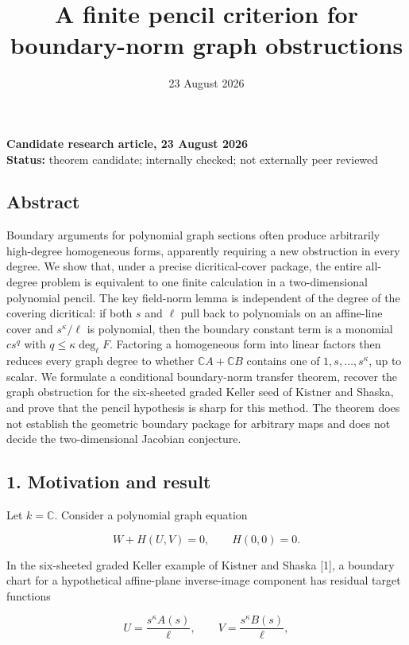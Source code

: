 \documentclass[
  11pt,
  a4paper,
]{article}
\title{A finite pencil criterion for boundary-norm graph obstructions}
\author{}
\date{23 August 2026}
\begin{document}
\maketitle

\textbf{Candidate research article, 23 August 2026}\\
\textbf{Status:} theorem candidate; internally checked; not externally
peer reviewed

\subsection{Abstract}\label{abstract}

Boundary arguments for polynomial graph sections often produce
arbitrarily high-degree homogeneous forms, apparently requiring a new
obstruction in every degree. We show that, under a precise
dicritical-cover package, the entire all-degree problem is equivalent to
one finite calculation in a two-dimensional polynomial pencil. The key
field-norm lemma is independent of the degree of the covering
dicritical: if both \(s\) and \(\ell\) pull back to polynomials on an
affine-line cover and \(s^\kappa/\ell\) is polynomial, then the boundary
constant term is a monomial \(cs^q\) with \(q\le\kappa\deg_\ell F\).
Factoring a homogeneous form into linear factors then reduces every
graph degree to whether \(\mathbb C A+\mathbb C B\) contains one of
\(1,s,\ldots,s^\kappa\), up to scalar. We formulate a conditional
boundary-norm transfer theorem, recover the graph obstruction for the
six-sheeted graded Keller seed of Kistner and Shaska, and prove that the
pencil hypothesis is sharp for this method. The theorem does not
establish the geometric boundary package for arbitrary maps and does not
decide the two-dimensional Jacobian conjecture.

\subsection{1. Motivation and result}\label{motivation-and-result}

Let \(k=\mathbb C\). Consider a polynomial graph equation

\[
W+H(U,V)=0,
\qquad H(0,0)=0.
\]

In the six-sheeted graded Keller example of Kistner and Shaska {[}1{]},
a boundary chart for a hypothetical affine-plane inverse-image component
has residual target functions

\[
U=\frac{s^\kappa A(s)}{\ell},
\qquad
V=\frac{s^\kappa B(s)}{\ell},
\tag{1.1}
\]
\end{document}
